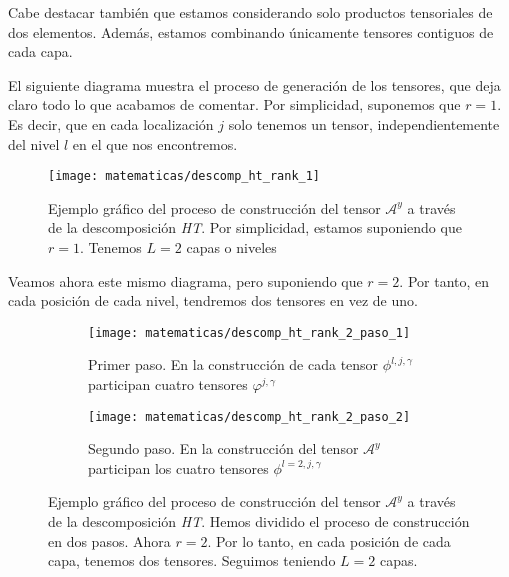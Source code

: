 Cabe destacar también que estamos considerando solo productos tensoriales de dos elementos. Además, estamos combinando únicamente tensores contiguos de cada capa.

El siguiente diagrama muestra el proceso de generación de los tensores, que deja claro todo lo que acabamos de comentar. Por simplicidad, suponemos que $r = 1$. Es decir, que en cada localización $j$ solo tenemos un tensor, independientemente del nivel $l$ en el que nos encontremos.

\begin{figure}[H]
    \centering
    \texttt{[image: matematicas/descomp\_ht\_rank\_1]}
    \caption{Ejemplo gráfico del proceso de construcción del tensor $\mathcal{A}^y$ a través de la descomposición \textit{HT}. Por simplicidad, estamos suponiendo que $r = 1$. Tenemos $L = 2$ capas o niveles}
    \label{img:diagrama_ht_simple}
\end{figure}

Veamos ahora este mismo diagrama, pero suponiendo que $r = 2$. Por tanto, en cada posición de cada nivel, tendremos dos tensores en vez de uno.

\begin{figure}[H]
\centering
    \ajustarsubcaptions
    \begin{subfigure}{.5\textwidth}
        \centering
        \texttt{[image: matematicas/descomp\_ht\_rank\_2\_paso\_1]}
        \caption{Primer paso. En la construcción de cada tensor $\phi^{l, j, \gamma}$ participan cuatro tensores $\varphi^{j, \gamma}$}
    \end{subfigure}%
    \begin{subfigure}{.5\textwidth}
        \centering
        \texttt{[image: matematicas/descomp\_ht\_rank\_2\_paso\_2]}
        \caption{Segundo paso. En la construcción del tensor $\mathcal{A}^y$ participan los cuatro tensores $\phi^{l=2, j, \gamma}$}
    \end{subfigure}
    \caption{Ejemplo gráfico del proceso de construcción del tensor $\mathcal{A}^y$ a través de la descomposición \textit{HT}. Hemos dividido el proceso de construcción en dos pasos. Ahora $r = 2$. Por lo tanto, en cada posición de cada capa, tenemos dos tensores. Seguimos teniendo $L = 2$ capas. }
    \label{img:diagrama_ht_complejo}
\end{figure}


